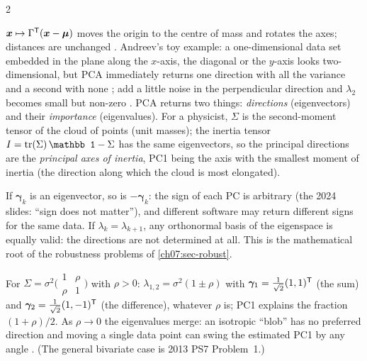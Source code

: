 \begin{paracol}{2}
\begin{intuition}
$\bm x\mapsto\Gamma^{\mathsf T}(\bm x-\bm\mu)$ moves the origin to the centre of mass and rotates the axes; distances are
unchanged . Andreev's toy example: a one-dimensional data set embedded in the plane
along the $x$-axis, the diagonal or the $y$-axis looks two-dimensional, but PCA immediately returns one
direction with all the variance and a second with none ; add a little noise in the
perpendicular direction and $\lambda_2$ becomes small but non-zero . PCA returns two things:
\emph{directions} (eigenvectors) and their \emph{importance} (eigenvalues). For a physicist, $\Sigma$ is the
second-moment tensor of the cloud of points (unit masses); the inertia tensor $I=\tr(\Sigma)\,\mathbb 1-\Sigma$ has
the same eigenvectors, so the principal directions are the \emph{principal axes of inertia}, PC1 being the
axis with the smallest moment of inertia (the direction along which the cloud is most elongated).
\end{intuition}

\begin{remark}[Uniqueness]\label{ch07:rem-sign}
If $\bm\gamma_k$ is an eigenvector, so is $-\bm\gamma_k$: the sign of each PC is arbitrary (the 2024 slides:
``sign does not matter''), and different software may return different signs for the same data. If
$\lambda_k=\lambda_{k+1}$, any orthonormal basis of the eigenspace is equally valid: the directions are not
determined at all. This is the mathematical root of the robustness problems of \cref{ch07:sec-robust}.
\end{remark}

\begin{example}\label{ch07:ex-2d}
For $\Sigma=\sigma^2\bigl(\begin{smallmatrix}1&\rho\\ \rho&1\end{smallmatrix}\bigr)$ with $\rho>0$: $\lambda_{1,2}=\sigma^2(1\pm\rho)$ with
$\bm\gamma_1=\frac1{\sqrt2}(1,1)^{\mathsf T}$ (the sum) and $\bm\gamma_2=\frac1{\sqrt2}(1,-1)^{\mathsf T}$ (the difference), whatever $\rho$ is;
PC1 explains the fraction $(1+\rho)/2$. As $\rho\to0$ the eigenvalues merge: an isotropic ``blob'' has no
preferred direction and moving a single data point can swing the estimated PC1 by any angle
. (The general bivariate case is 2013 PS7 Problem~1.)
\end{example}


\end{paracol}
